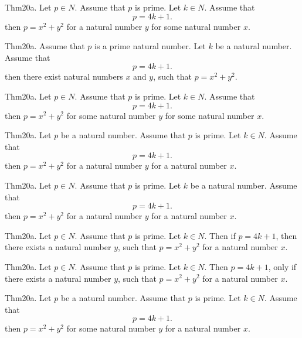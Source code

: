 \documentclass{article}
\begin{document}
Thm20a. Let $p \in N$. Assume that $p$ is prime. Let $k \in N$. Assume that $$p = 4 k + 1.$$ then $p = x ^{ 2}+ y ^{ 2}$ for a natural number $y$ for some natural number $x$.

Thm20a. Assume that $p$ is a prime natural number. Let $k$ be a natural number. Assume that $$p = 4 k + 1.$$ then there exist natural numbers $x$ and $y$, such that $p = x ^{ 2}+ y ^{ 2}$.

Thm20a. Let $p \in N$. Assume that $p$ is prime. Let $k \in N$. Assume that $$p = 4 k + 1.$$ then $p = x ^{ 2}+ y ^{ 2}$ for some natural number $y$ for some natural number $x$.

Thm20a. Let $p$ be a natural number. Assume that $p$ is prime. Let $k \in N$. Assume that $$p = 4 k + 1.$$ then $p = x ^{ 2}+ y ^{ 2}$ for a natural number $y$ for a natural number $x$.

Thm20a. Let $p \in N$. Assume that $p$ is prime. Let $k$ be a natural number. Assume that $$p = 4 k + 1.$$ then $p = x ^{ 2}+ y ^{ 2}$ for a natural number $y$ for a natural number $x$.

Thm20a. Let $p \in N$. Assume that $p$ is prime. Let $k \in N$. Then if $p = 4 k + 1$, then there exists a natural number $y$, such that $p = x ^{ 2}+ y ^{ 2}$ for a natural number $x$.

Thm20a. Let $p \in N$. Assume that $p$ is prime. Let $k \in N$. Then $p = 4 k + 1$, only if there exists a natural number $y$, such that $p = x ^{ 2}+ y ^{ 2}$ for a natural number $x$.

Thm20a. Let $p$ be a natural number. Assume that $p$ is prime. Let $k \in N$. Assume that $$p = 4 k + 1.$$ then $p = x ^{ 2}+ y ^{ 2}$ for some natural number $y$ for a natural number $x$.
\end{document}
